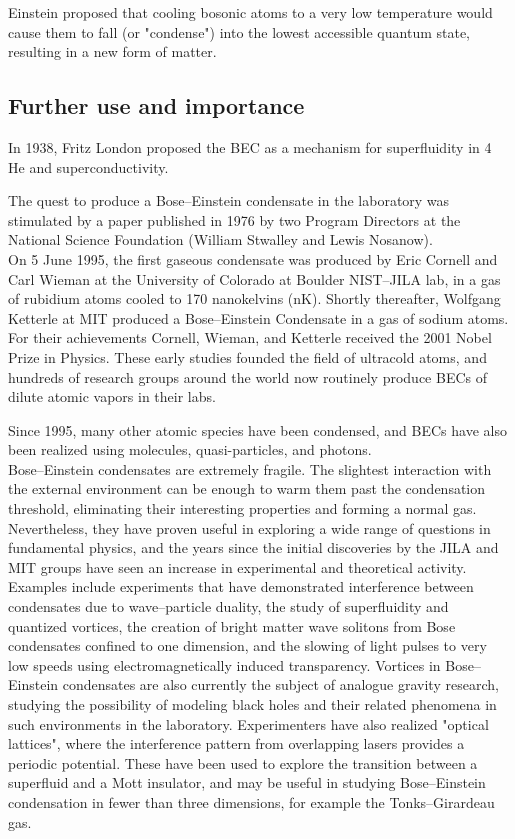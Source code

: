 \documentclass[12pt, letterpaper]{article}
\begin{document}
    Einstein proposed that cooling bosonic atoms to a very low temperature would cause them to fall (or "condense") into the 
    lowest accessible quantum state, resulting in a new form of matter.\\
    \subsection*{Further use and importance}
    In 1938, Fritz London proposed the BEC as a mechanism for superfluidity in 4
    He
    and superconductivity.
    
    The quest to produce a Bose–Einstein condensate in the laboratory was stimulated by a paper published in 1976 by two
    Program Directors at the National Science Foundation (William Stwalley and Lewis Nosanow).\\ 

    On 5 June 1995, the first gaseous condensate was produced by Eric Cornell and Carl Wieman at the University of Colorado 
    at Boulder NIST–JILA lab, in a gas of rubidium atoms cooled to 170 nanokelvins (nK). Shortly thereafter, Wolfgang Ketterle at 
    MIT produced a Bose–Einstein Condensate in a gas of sodium atoms. For their achievements Cornell, Wieman, and Ketterle received 
    the 2001 Nobel Prize in Physics. These early studies founded the field of ultracold atoms, and hundreds of research groups 
    around the world now routinely produce BECs of dilute atomic vapors in their labs.

    Since 1995, many other atomic species have been condensed, and BECs have also been realized using molecules, 
    quasi-particles, and photons. \\ 
    
    Bose–Einstein condensates are extremely fragile. The slightest interaction with the external environment can be enough to 
    warm them past the condensation threshold, eliminating their interesting properties and forming a normal gas.
    Nevertheless, they have proven useful in exploring a wide range of questions in fundamental physics, and the years since 
    the initial discoveries by the JILA and MIT groups have seen an increase in experimental and theoretical activity. 
    Examples include experiments that have demonstrated interference between condensates due to wave–particle duality,
    the study of superfluidity and quantized vortices, the creation of bright matter wave solitons from Bose condensates confined 
    to one dimension, and the slowing of light pulses to very low speeds using electromagnetically induced transparency. Vortices 
    in Bose–Einstein condensates are also currently the subject of analogue gravity research, studying the possibility of 
    modeling black holes and their related phenomena in such environments in the laboratory. Experimenters have also realized 
    "optical lattices", where the interference pattern from overlapping lasers provides a periodic potential. 
    These have been used to explore the transition between a superfluid and a Mott insulator, and may be useful in studying 
    Bose–Einstein condensation in fewer than three dimensions, for example the Tonks–Girardeau gas. \\ 
\end{document}
